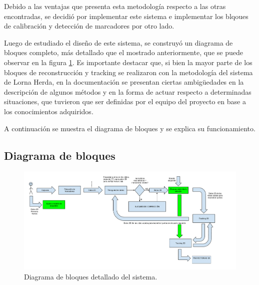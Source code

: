 Debido a las ventajas que presenta esta metodología respecto a las otras encontradas, se decidió por implementar este sistema e implementar los blqoues de calibración y detección de marcadores por otro lado.

Luego de estudiado el diseño de este sistema, se construyó un diagrama de bloques completo, más detallado que el mostrado anteriormente, que se puede observar en la figura \ref{diagBloq}. Es importante destacar que, si bien la mayor parte de los bloques de reconstrucción y tracking se realizaron con la metodología del sistema de Lorna Herda\cite{herda}, en la documentación se presentan ciertas ambigüedades en la descripción de algunos métodos y en la forma de actuar respecto a determinadas situaciones, que tuvieron que ser definidas por el equipo del proyecto en base a los conocimientos adquiridos.

A continuación se muestra el diagrama de bloques y se explica su funcionamiento.

\subsection{Diagrama de bloques}

\begin{figure}[H]
\begin{center}
\includegraphics[scale=0.32]{img/Sistema_completo/Diagramadebloques_Herda.pdf}
\end{center}
\caption{Diagrama de bloques detallado del sistema.}
\label{diagBloq}
\end{figure}

